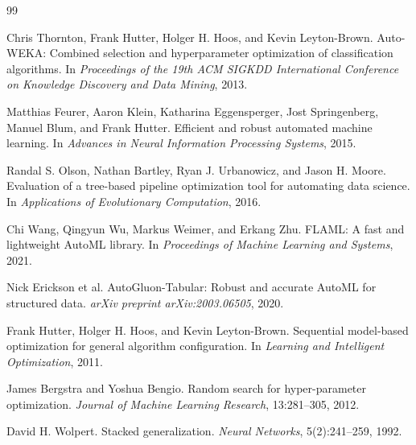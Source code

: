 \documentclass[12pt,a4paper,oneside]{report}
\begin{document}
\begin{thebibliography}{99}

Chris Thornton, Frank Hutter, Holger H. Hoos, and Kevin Leyton-Brown.
\newblock Auto-WEKA: Combined selection and hyperparameter optimization of
classification algorithms.
\newblock In \emph{Proceedings of the 19th ACM SIGKDD International Conference
on Knowledge Discovery and Data Mining}, 2013.

Matthias Feurer, Aaron Klein, Katharina Eggensperger, Jost Springenberg,
Manuel Blum, and Frank Hutter.
\newblock Efficient and robust automated machine learning.
\newblock In \emph{Advances in Neural Information Processing Systems}, 2015.

Randal S. Olson, Nathan Bartley, Ryan J. Urbanowicz, and Jason H. Moore.
\newblock Evaluation of a tree-based pipeline optimization tool for automating
data science.
\newblock In \emph{Applications of Evolutionary Computation}, 2016.

Chi Wang, Qingyun Wu, Markus Weimer, and Erkang Zhu.
\newblock FLAML: A fast and lightweight AutoML library.
\newblock In \emph{Proceedings of Machine Learning and Systems}, 2021.

Nick Erickson et al.
\newblock AutoGluon-Tabular: Robust and accurate AutoML for structured data.
\newblock \emph{arXiv preprint arXiv:2003.06505}, 2020.

Frank Hutter, Holger H. Hoos, and Kevin Leyton-Brown.
\newblock Sequential model-based optimization for general algorithm
configuration.
\newblock In \emph{Learning and Intelligent Optimization}, 2011.

James Bergstra and Yoshua Bengio.
\newblock Random search for hyper-parameter optimization.
\newblock \emph{Journal of Machine Learning Research}, 13:281--305, 2012.

David H. Wolpert.
\newblock Stacked generalization.
\newblock \emph{Neural Networks}, 5(2):241--259, 1992.

\end{thebibliography}
\end{document}
